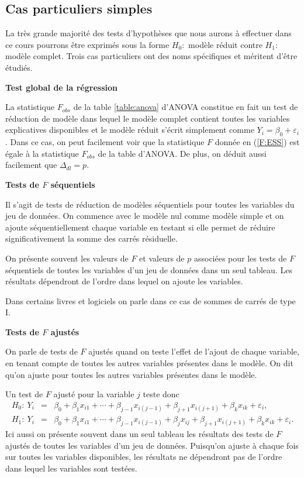 \subsection{Cas particuliers simples}

La très grande majorité des tests d'hypothèses que nous aurons à effectuer dans ce cours
pourrons \^etre exprimés sous la forme $H_0:$ mod\`ele réduit contre $H_1:$ mod\`ele complet. Trois cas particuliers ont des noms spécifiques et méritent d'être étudiés.

\textbf{Test global de la régression}

La statistique $F_{obs}$ de la table \ref{table:anova} d'ANOVA constitue en fait un test de réduction de modèle dans lequel le mod\`ele complet contient toutes les variables explicatives disponibles et le modèle réduit s'écrit simplement comme $Y_i=\beta_0+\varepsilon_i$.  Dans ce cas, on peut facilement voir que la statistique $F$ donnée en (\ref{F:ESS}) est égale \`a la statistique $F_{obs}$ de la table d'ANOVA. De plus, on déduit aussi facilement que $\Delta_{dl}=p$.


\textbf{Tests de $F$ séquentiels}

Il s'agit de tests de réduction de modèles séquentiels pour toutes les variables du jeu de données. On commence avec le modèle nul comme modèle simple et on ajoute séquentiellement chaque variable en testant si elle permet de réduire significativement la somme des carrés résiduelle.

On présente souvent les valeurs de $F$ et valeurs de $p$ associées pour les tests de $F$ séquentiels de toutes les variables d'un jeu de données dans un seul tableau. Les résultats dépendront de l'ordre dans lequel on ajoute les variables.

\begin{remarque}
Dans certains livres et logiciels on parle dans ce cas de sommes de carrés de type I.
\end{remarque}


\textbf{Tests de $F$ ajustés}

On parle de tests de $F$ ajustés quand on teste l'effet de l'ajout de chaque variable, en tenant compte de toutes les autres variables présentes dans le modèle. On dit qu'on ajuste pour toutes les autres variables présentes dans le modèle.

Un test de $F$ ajusté pour la variable $j$ teste donc
\begin{eqnarray*}
H_0:~Y_i&=&\beta_0+\beta_1x_{i1}+\cdots+ \beta_{j-1}x_{i(j-1)} + \beta_{j+1}x_{i(j+1)}+ \beta_kx_{ik}+\varepsilon_i,\\
H_1:~Y_i&=&\beta_0+\beta_1x_{i1}+\cdots+ \beta_{j-1}x_{i(j-1)} + \beta_{j}x_{ij}+ \beta_{j+1}x_{i(j+1)}+ \beta_kx_{ik}+\varepsilon_i.
\end{eqnarray*}
Ici aussi on présente souvent dans un seul tableau les résultats des tests de $F$ ajustés de toutes les variables d'un jeu de données. Puisqu'on ajuste à chaque fois sur toutes les variables disponibles, les résultats ne dépendront pas de l'ordre dans lequel les variables sont testées.

